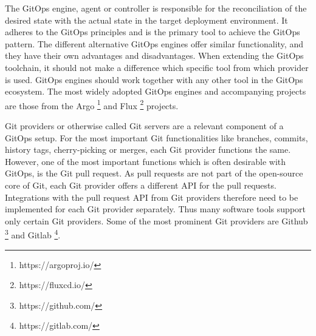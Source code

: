 

The GitOps engine, agent or controller is responsible for the
reconciliation of the desired state with the actual state
in the target deployment environment.
It adheres to the GitOps principles and is the primary tool
to achieve the GitOps pattern.
The different alternative GitOps engines offer similar functionality,
and they have their own advantages and disadvantages.
When extending the GitOps toolchain, it should not make a difference which specific
tool from which provider is used.
GitOps engines should work together with any other tool in the GitOps ecosystem.
The most widely adopted GitOps engines and accompanying projects are those from
the Argo
\footnote{https://argoproj.io/}
and Flux
\footnote{https://fluxcd.io/}
projects.









Git providers or otherwise called Git servers are a relevant component of
a GitOps setup.
For the most important Git functionalities like branches, commits, history
tags, cherry-picking or merges, each Git provider functions the same.
However, one of the most important functions which is often desirable with GitOps, is the Git pull request.
As pull requests are not part of the open-source core of Git,
each Git provider offers a different API for the pull requests.
Integrations with the pull request API from Git providers therefore need to be implemented
for each Git provider separately. Thus many software tools support only certain Git providers.
Some of the most prominent Git providers are
Github \footnote{https://github.com/} and
Gitlab \footnote{https://gitlab.com/}.





























